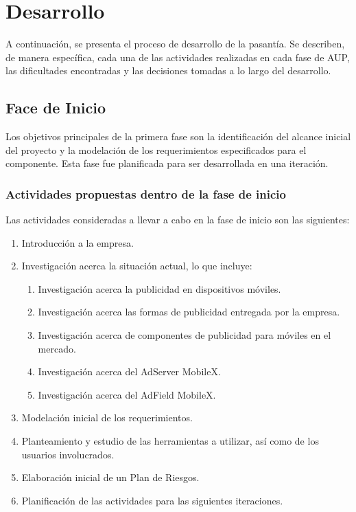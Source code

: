 
\chapter{Desarrollo}

\thispagestyle{empty} 

A continuación, se presenta el proceso de desarrollo de la pasantía.
Se describen, de manera específica, cada una de las actividades realizadas
en cada fase de AUP, las dificultades encontradas y las decisiones
tomadas a lo largo del desarrollo. 


\section{Face de Inicio}

Los objetivos principales de la primera fase son la identificación
del alcance inicial del proyecto y la modelación de los requerimientos
especificados para el componente. Esta fase fue planificada para ser
desarrollada en una iteración. 


\subsection{Actividades propuestas dentro de la fase de inicio}

Las actividades consideradas a llevar a cabo en la fase de inicio
son las siguientes:
\begin{enumerate}
\item Introducción a la empresa.
\item Investigación acerca la situación actual, lo que incluye: 

\begin{enumerate}
\item Investigación acerca la publicidad en dispositivos móviles. 
\item Investigación acerca las formas de publicidad entregada por la empresa. 
\item Investigación acerca de componentes de publicidad para móviles en
el mercado.
\item Investigación acerca del AdServer MobileX. 
\item Investigación acerca del AdField MobileX.
\end{enumerate}
\item Modelación inicial de los requerimientos.
\item Planteamiento y estudio de las herramientas a utilizar, así como de
los usuarios involucrados. 
\item Elaboración inicial de un Plan de Riesgos. 
\item Planificación de las actividades para las siguientes iteraciones.
\end{enumerate}

